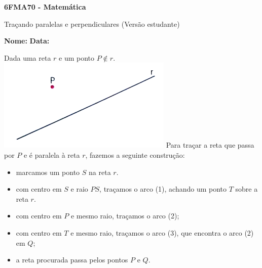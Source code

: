 \documentclass[a4paper,14pt]{article}
\begin{document}
	
	\noindent\textbf{6FMA70 - Matemática} 
	
	\begin{center}Traçando paralelas e perpendiculares (Versão estudante)
	\end{center}
	
	\noindent\textbf{Nome:} \underline{\hspace{10cm}}
	\noindent\textbf{Data:} \underline{\hspace{4cm}}
	
	
	\begin{multicols}{2}
		\noindent Dada uma reta $r$ e um ponto $P \notin r$.
		\includegraphics[width=1\linewidth]{6FMA70_imagens/imagem1}
		Para traçar a reta que passa por $P$ e é paralela à reta $r$, fazemos a seguinte construção:
		\begin{itemize}
			\item marcamos um ponto $S$ na reta $r$.
			\item com centro em $S$ e raio $PS$, traçamos o arco (1), achando um ponto $T$ sobre a reta $r$.
			\item com centro em $P$ e mesmo raio, traçamos o arco (2);
			\item com centro em $T$ e mesmo raio, traçamos o arco (3), que encontra o arco (2) em $Q$;
			\item a reta procurada passa pelos pontos $P$ e $Q$.
		\end{itemize}

\end{multicols}
\end{document}
